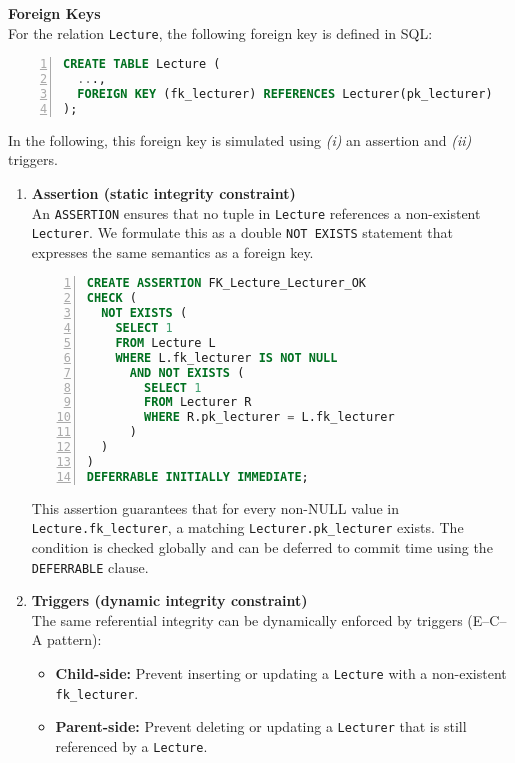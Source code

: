 \documentclass{article}
\begin{document}
\begin{subtasks}

\item %
\textbf{Foreign Keys}\\
For the relation \texttt{Lecture}, the following foreign key is defined in SQL:
\begin{lstlisting}[language=SQL,frame=single,numbers=left,numberstyle=\tiny]
CREATE TABLE Lecture (
  ...,
  FOREIGN KEY (fk_lecturer) REFERENCES Lecturer(pk_lecturer)
);
\end{lstlisting}

In the following, this foreign key is simulated using \emph{(i)} an assertion and \emph{(ii)} triggers.

\begin{enumerate}[label=(\roman*)]
\item \textbf{Assertion (static integrity constraint)}\\
An \texttt{ASSERTION} ensures that no tuple in \texttt{Lecture} references a non-existent \texttt{Lecturer}.
We formulate this as a double \texttt{NOT EXISTS} statement that expresses the same semantics as a foreign key.

\begin{lstlisting}[language=SQL,frame=single,numbers=left,numberstyle=\tiny]
CREATE ASSERTION FK_Lecture_Lecturer_OK
CHECK (
  NOT EXISTS (
    SELECT 1
    FROM Lecture L
    WHERE L.fk_lecturer IS NOT NULL
      AND NOT EXISTS (
        SELECT 1
        FROM Lecturer R
        WHERE R.pk_lecturer = L.fk_lecturer
      )
  )
)
DEFERRABLE INITIALLY IMMEDIATE;
\end{lstlisting}

This assertion guarantees that for every non-NULL value in \texttt{Lecture.fk\_lecturer}, a matching \texttt{Lecturer.pk\_lecturer} exists. The condition is checked globally and can be deferred to commit time using the \texttt{DEFERRABLE} clause.

\item \textbf{Triggers (dynamic integrity constraint)}\\
The same referential integrity can be dynamically enforced by triggers (E–C–A pattern):
\begin{itemize}
  \item \textbf{Child-side:} Prevent inserting or updating a \texttt{Lecture} with a non-existent \texttt{fk\_lecturer}.
  \item \textbf{Parent-side:} Prevent deleting or updating a \texttt{Lecturer} that is still referenced by a \texttt{Lecture}.
\end{itemize}


\end{enumerate}
\end{subtasks}
\end{document}
